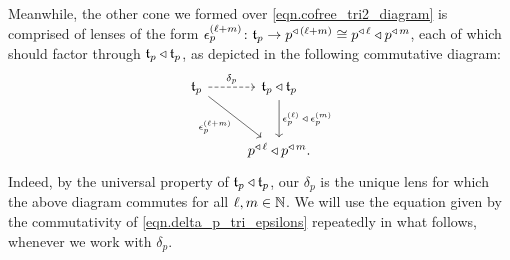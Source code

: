 \documentclass[Book-Poly]{subfiles}
\begin{document}
Meanwhile, the other cone we formed over \eqref{eqn.cofree_tri2_diagram} is comprised of lenses of the form $\epsilon^{(\ell+m)}_p\colon\mathfrak{t}_p\to p^{\mathbin{\triangleleft}\,(\ell+m)}\cong p^{\mathbin{\triangleleft}\,\ell}\mathbin{\triangleleft} p^{\mathbin{\triangleleft}\,m}$, each of which should factor through $\mathfrak{t}_p\mathbin{\triangleleft}\mathfrak{t}_p$, as depicted in the following commutative diagram:
\begin{equation} \label{eqn.delta_p_tri_epsilons}
\begin{tikzcd}[row sep=large]
    \car{t}_p \ar[r,dashed,"\delta_p"] \ar[dr,"\epsilon^{(\ell+m)}_p"'] & \car{t}_p\tri\car{t}_p \ar[d,"\epsilon^{(\ell)}_p\:\tri\:\epsilon^{(m)}_p"] \\
    & p\tripow{\ell}\tri p\tripow{m}.
\end{tikzcd}
\end{equation}
Indeed, by the universal property of $\mathfrak{t}_p\mathbin{\triangleleft}\mathfrak{t}_p$, our $\delta_p$ is the unique lens for which the above diagram commutes for all $\ell,m\in\mathbb{N}$.
We will use the equation given by the commutativity of \eqref{eqn.delta_p_tri_epsilons} repeatedly in what follows, whenever we work with $\delta_p$.
\end{document}
